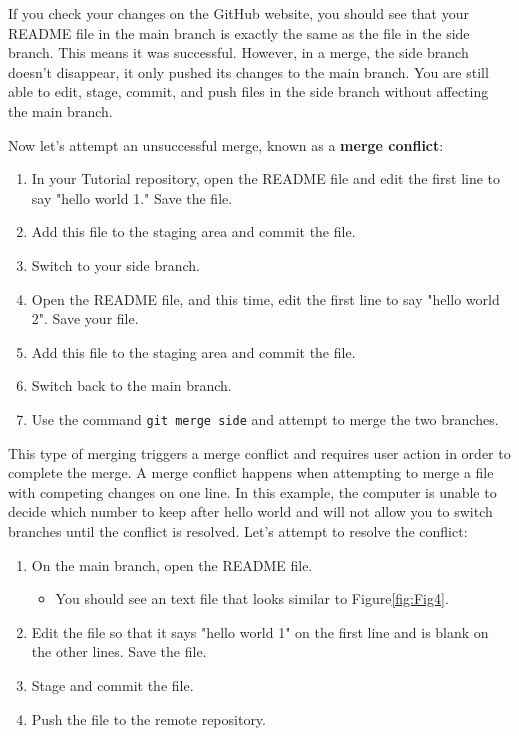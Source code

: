 \documentclass[10pt]{article}
\begin{document}
If you check your changes on the GitHub website, you should see that your README file in the main branch is exactly the same as the file in the side branch. This means it was successful. However, in a merge, the side branch doesn't disappear, it only pushed its changes to the main branch. You are still able to edit, stage, commit, and push files in the side branch without affecting the main branch. 

Now let's attempt an unsuccessful merge, known as a \textbf{merge conflict}:

\begin{enumerate}
\item In your Tutorial repository, open the README file and edit the first line to say "hello world 1." Save the file.
\item Add this file to the staging area and commit the file. 
\item Switch to your side branch.
\item Open the README file, and this time, edit the first line to say "hello world 2". Save your file.
\item Add this file to the staging area and commit the file. 
\item Switch back to the main branch.
\item Use the command \texttt{git merge side} and attempt to merge the two branches.
\end{enumerate}

This type of merging triggers a merge conflict and requires user action in order to complete the merge. A merge conflict happens when attempting to merge a file with competing changes on one line. In this example, the computer is unable to decide which number to keep after hello world and will not allow you to switch branches until the conflict is resolved. Let's attempt to resolve the conflict:

\begin{enumerate}
\item On the main branch, open the README file. 
	\begin{itemize}
	\item You should see an text file that looks similar to Figure\ref{fig:Fig4}. 
	\end{itemize}
\item Edit the file so that it says "hello world 1" on the first line and is blank on the other lines. Save the file.
\item Stage and commit the file. 
\item Push the file to the remote repository. 
\end{enumerate}
\end{document}
